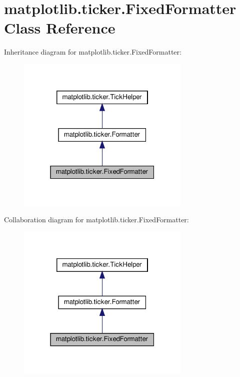 \hypertarget{classmatplotlib_1_1ticker_1_1FixedFormatter}{}\section{matplotlib.\+ticker.\+Fixed\+Formatter Class Reference}
\label{classmatplotlib_1_1ticker_1_1FixedFormatter}


Inheritance diagram for matplotlib.\+ticker.\+Fixed\+Formatter\+:
\nopagebreak
\begin{figure}[H]
\begin{center}
\leavevmode
\includegraphics[width=235pt]{classmatplotlib_1_1ticker_1_1FixedFormatter__inherit__graph}
\end{center}
\end{figure}


Collaboration diagram for matplotlib.\+ticker.\+Fixed\+Formatter\+:
\nopagebreak
\begin{figure}[H]
\begin{center}
\leavevmode
\includegraphics[width=235pt]{classmatplotlib_1_1ticker_1_1FixedFormatter__coll__graph}
\end{center}
\end{figure}
